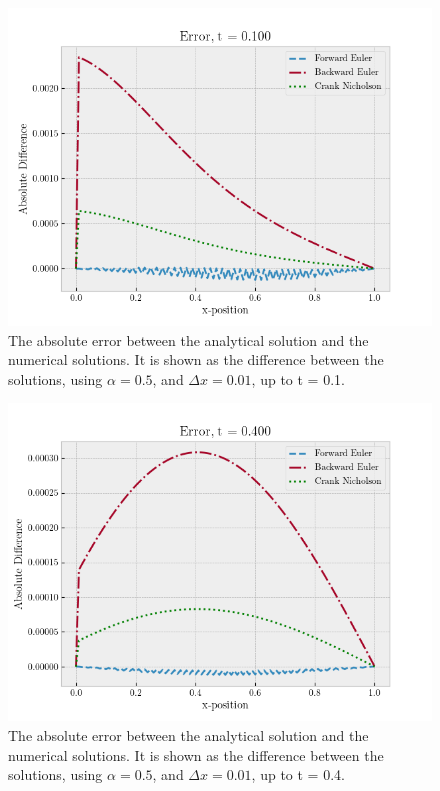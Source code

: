 \documentclass[%
reprint,
nofootinbib,
amsmath,amssymb,
aps,
]{revtex4-1}
\newcommand{\dx}{{\Delta x}}
\begin{document}
\begin{figure}
	\centering
	\includegraphics[width=0.95\linewidth]{./figures/error01001.png}
	\caption{The absolute error between the analytical solution and the numerical solutions. It is shown as the difference between the solutions, using $\alpha = 0.5$, and $\dx = 0.01$, up to t = 0.1.}
	\label{fig error01001}
\end{figure}
\begin{figure}
	\centering
	\includegraphics[width=0.95\linewidth]{./figures/error04001.png}
	\caption{The absolute error between the analytical solution and the numerical solutions. It is shown as the difference between the solutions, using $\alpha = 0.5$, and $\dx = 0.01$, up to t = 0.4.}
	\label{fig error04001}
\end{figure}
\end{document}
